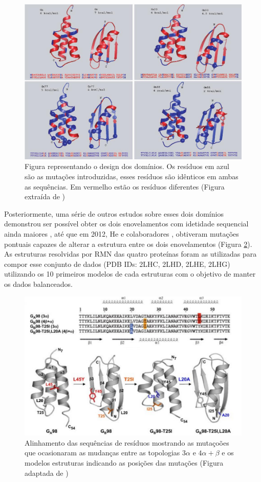 \begin{figure}
  \centering
  \includegraphics[width=1.0\textwidth]{figures/ga_gb.jpg}
  \caption{Figura representando o design dos domínios. Os resíduos em azul são as mutações introduzidas, esses resíduos são idênticos em ambas as sequências. Em vermelho estão os resíduos diferentes (Figura extraída de \cite{Alexander2007})}
        \label{fig:ga_gb}
\end{figure}

Posteriormente, uma série de outros estudos sobre esses dois domínios demonstrou ser possível obter os dois enovelamentos com idetidade sequencial ainda maiores \cite{He2008,Alexander2009}, até que em 2012, He e colaboradores \cite{He2012}, obtiveram mutações pontuais capazes de alterar a estrutura entre os dois enovelamentos (Figura \ref{fig:camaleonicas}). As estruturas resolvidas por RMN das quatro proteínas foram as utilizadas para compor esse conjunto de dados (PDB IDs: 2LHC, 2LHD, 2LHE, 2LHG) utilizando os 10 primeiros modelos de cada estruturas com o objetivo de manter os dados balanceados.

\begin{figure}
  \centering
  \includegraphics[width=1.0\textwidth]{figures/chameleonic_resume.pdf}
  \caption{Alinhamento das sequências de resíduos mostrando as mutaçoões que ocasionaram as mudanças entre as topologias $3\alpha$ e $4\alpha+\beta$ e os modelos estruturas indicando as posições das mutações (Figura adaptada de \cite{He2012})}
        \label{fig:camaleonicas}
\end{figure}
